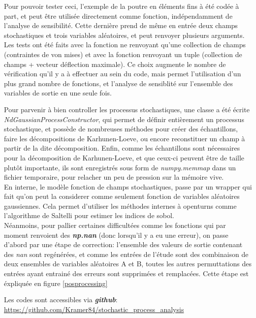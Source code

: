 \documentclass[a4paper,10pt]{article}
\begin{document}
Pour pouvoir tester ceci, l'exemple de la poutre en éléments fins à été codée à part, et peut être utilisée directement comme fonction, indépendamment de l'analyse de sensibilité. Cette dernière prend de même en entrée deux champs stochastiques et trois variables aléatoires, et peut renvoyer plusieurs arguments. Les tests ont été faits avec la fonction ne renvoyant qu'une collection de champs (contraintes de von mises) et avec la fonction renvoyant un tuple (collection de champs + vecteur déflection maximale). Ce choix augmente le nombre de vérification qu'il y a à effectuer au sein du code, mais permet l'utilisation d'un plus grand nombre de fonctions, et l'analyse de sensiblité sur l'ensemble des variables de sortie en une seule fois.

Pour parvenir à bien controller les processus stochastiques, une classe a été écrite \textit{NdGaussianProcessConstructor}, qui permet de définir entièrement un processus stochastique, et possède de nombreuses méthodes pour créer des échantillons, faire les décompositions de Karhunen-Loeve, ou encore reconstituer un champ à partir de la dite décomposition. Enfin, comme les échantillons sont nécessaires pour la décomposition de Karhunen-Loeve, et que ceux-ci peuvent être de taille plutôt importante, ils sont enregistrés sous form de \textit{numpy.memmap} dans un fichier temporaire, pour relacher un peu de pression sur la mémoire vive.\\

En interne, le modèle fonction de champs stochastiques, passe par un wrapper qui fait qu'on peut la considerer comme seulement fonction de variables aléatoires gaussiennes. Cela permet d'utiliser les méthodes internes à openturns comme l'algorithme de Saltelli pour estimer les indices de sobol. \\

Néanmoins, pour pallier certaines difficultées comme les fonctions qui par moment renvoient des \textbf{\textit{np.nan}} (donc lorsqu'il y a eu une erreur), on passe d'abord par une étape de correction:  l'ensemble des valeurs de sortie contenant des \textit{nan} sont regénérées, et comme les entrées de l'étude sont des combinaison de deux ensembles de variables aléatoires A et B, toutes les autres permuttations des entrées ayant entrainé des erreurs sont supprimées et remplacées. Cette étape est éxpliquée en figure \ref{posprocessing} \

Les codes sont accessibles via \textit{\textbf{github}}: \\
\url{https://github.com/Kramer84/stochastic_process_analysis}
\end{document}
